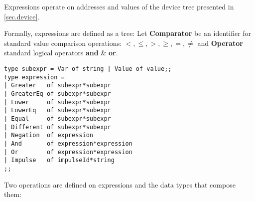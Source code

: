 \documentclass{article}
\begin{document}
Expressions operate on addresses and values of the device tree presented in \ref{sec.device}.

Formally, expressions are defined as a tree:
Let \textbf{Comparator} be an identifier for standard value comparison operations: $<, \leq, >, \geq, =, \neq$ and \textbf{Operator} standard logical operators \textbf{and} \&  \textbf{or}.

\begin{lstlisting}
type subexpr = Var of string | Value of value;;
type expression =
| Greater   of subexpr*subexpr
| GreaterEq of subexpr*subexpr
| Lower     of subexpr*subexpr
| LowerEq   of subexpr*subexpr
| Equal     of subexpr*subexpr
| Different of subexpr*subexpr
| Negation  of expression
| And       of expression*expression
| Or        of expression*expression
| Impulse   of impulseId*string
;;
\end{lstlisting}
Two operations are defined on expressions and the data types that compose them: 

%    
%        
\end{document}
